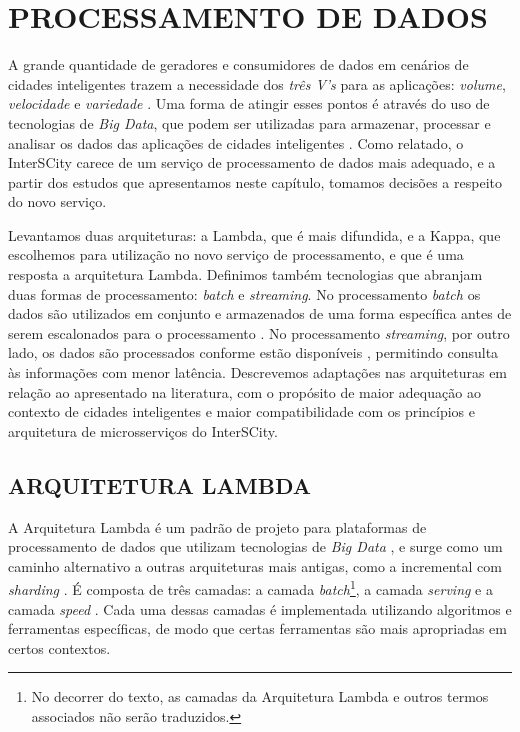 \chapter[PROCESSAMENTO DE DADOS]{PROCESSAMENTO DE DADOS}
\label{chapter:data}

A grande quantidade de geradores e consumidores de dados em cenários de cidades
inteligentes trazem a necessidade dos \textit{três V's} para as aplicações:
\textit{volume}, \textit{velocidade} e \textit{variedade} \cite{alnuaimi2015}.
Uma forma de atingir esses pontos é através do uso de tecnologias de
\textit{Big Data}, que podem ser utilizadas para armazenar, processar e analisar
os dados das aplicações de cidades inteligentes \cite{alnuaimi2015}. Como
relatado, o InterSCity carece de um serviço de processamento de dados mais
adequado, e a partir dos estudos que apresentamos neste capítulo, tomamos
decisões a respeito do novo serviço.

Levantamos duas arquiteturas: a Lambda, que é mais difundida, e a Kappa,
que escolhemos para utilização no novo serviço de processamento, e que é
uma resposta a arquitetura Lambda. Definimos também tecnologias que abranjam duas
formas de processamento: \textit{batch} e
\textit{streaming}. No processamento \textit{batch} os dados são utilizados
em conjunto e armazenados de uma forma específica antes de serem escalonados
para o processamento \cite{zheng2015real}. No processamento
\textit{streaming}, por outro lado, os dados são processados conforme estão
disponíveis \cite{zheng2015real}, permitindo consulta às informações com menor
latência. Descrevemos adaptações nas arquiteturas em relação ao apresentado
na literatura, com o propósito de maior adequação ao contexto de cidades
inteligentes e maior compatibilidade com os princípios e arquitetura de
microsserviços do InterSCity.

\section{ARQUITETURA LAMBDA}

A Arquitetura Lambda é um padrão de projeto para plataformas de processamento
de dados que utilizam tecnologias de \textit{Big Data} \cite{kiran2015}, e
surge como um caminho alternativo a outras arquiteturas mais antigas, como a
incremental com \textit{sharding} \cite{marz2015}. É composta de três camadas:
a camada \textit{batch}\footnote{No decorrer do texto, as camadas da
Arquitetura Lambda e outros termos associados não serão traduzidos.}, a camada
\textit{serving} e a camada \textit{speed} \cite{kiran2015}. Cada uma dessas
camadas é implementada utilizando algoritmos e ferramentas específicas, de modo
que certas ferramentas são mais apropriadas em certos contextos.

